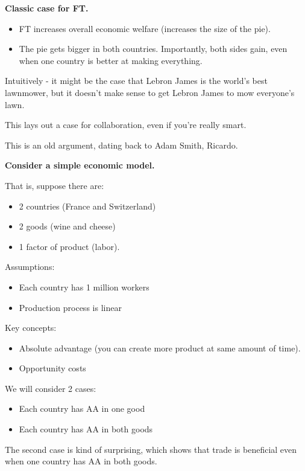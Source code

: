 \documentclass{article}
\begin{document}
  {\bf Classic case for FT.}

  \begin{itemize}
    \item FT increases overall economic welfare (increases the size of the pie).
    \item The pie gets bigger in both countries.  Importantly, both sides gain, even when one country is better at making everything.
  \end{itemize}

  Intuitively - it might be the case that Lebron James is the world's best lawnmower, but it doesn't make sense to get Lebron James to mow everyone's lawn.

  This lays out a case for collaboration, even if you're really smart.

  This is an old argument, dating back to Adam Smith, Ricardo.

  {\bf Consider a simple economic model.}

  That is, suppose there are:
  \begin{itemize}
    \item 2 countries (France and Switzerland)
    \item 2 goods (wine and cheese)
    \item 1 factor of product (labor).
  \end{itemize}
  
  Assumptions:
  \begin{itemize}
    \item Each country has 1 million workers
    \item Production process is linear
  \end{itemize}

  Key concepts:
  \begin{itemize}
    \item Absolute advantage (you can create more product at same amount of time).
    \item Opportunity costs
  \end{itemize}

  We will consider 2 cases:
  \begin{itemize}
    \item Each country has AA in one good
    \item Each country has AA in both goods
  \end{itemize}

  The second case is kind of surprising, which shows that trade is beneficial even when one country has AA in both goods.
\end{document}

